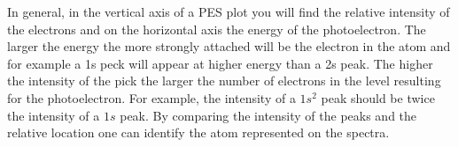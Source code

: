 \documentclass[main.tex]{subfiles}
\newcommand\chapterlabel{electrons}
\begin{document}
\begin{description}

In general, in the vertical axis of a PES plot you will find the relative intensity of the electrons and on the horizontal axis the energy of the photoelectron. The larger the energy the more strongly attached will be the electron in the atom and for example a 1s peck will appear at higher energy than a 2s peak. The higher the intensity of the pick the larger the number of electrons in the level resulting for the photoelectron. For example, the intensity of a $1s^2$ peak should be twice the intensity of a $1s$ peak. By comparing the intensity of the peaks and the relative location one can identify the atom represented on the spectra. 

    
           \label{Fig:{\chapterlabel}\thefigurenewcounter}


\end{description}
\end{document}
